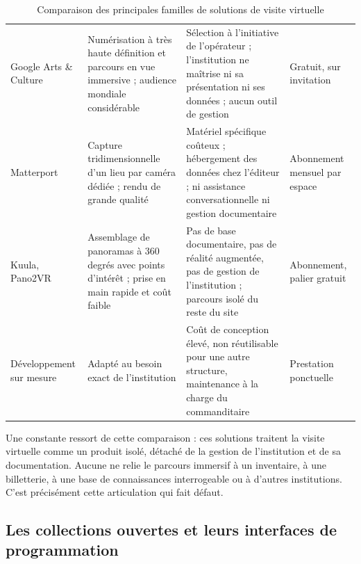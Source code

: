 \begin{table}[!ht]
\centering
\caption{Comparaison des principales familles de solutions de visite virtuelle}
\label{tab:comparvv}
\small
\begin{tabularx}{\textwidth}{|L{3.1cm}|X|L{3.0cm}|L{2.6cm}|}
\hline
{}
 &  &  &  \\ \hline
Google Arts \& Culture &
Numérisation à très haute définition et parcours en vue immersive ; audience
mondiale considérable &
Sélection à l'initiative de l'opérateur ; l'institution ne maîtrise ni sa
présentation ni ses données ; aucun outil de gestion &
Gratuit, sur invitation \\ \hline
Matterport &
Capture tridimensionnelle d'un lieu par caméra dédiée ; rendu de grande qualité &
Matériel spécifique coûteux ; hébergement des données chez l'éditeur ; ni
assistance conversationnelle ni gestion documentaire &
Abonnement mensuel par espace \\ \hline
Kuula, Pano2VR &
Assemblage de panoramas à 360 degrés avec points d'intérêt ; prise en main
rapide et coût faible &
Pas de base documentaire, pas de réalité augmentée, pas de gestion de
l'institution ; parcours isolé du reste du site &
Abonnement, palier gratuit \\ \hline
Développement sur mesure &
Adapté au besoin exact de l'institution &
Coût de conception élevé, non réutilisable pour une autre structure, maintenance
à la charge du commanditaire &
Prestation ponctuelle \\ \hline
\end{tabularx}
\end{table}


Une constante ressort de cette comparaison : ces solutions traitent la visite
virtuelle comme un produit isolé, détaché de la gestion de l'institution et de
sa documentation. Aucune ne relie le parcours immersif à un inventaire, à une
billetterie, à une base de connaissances interrogeable ou à d'autres
institutions. C'est précisément cette articulation qui fait défaut.

\subsection{Les collections ouvertes et leurs interfaces de programmation}

